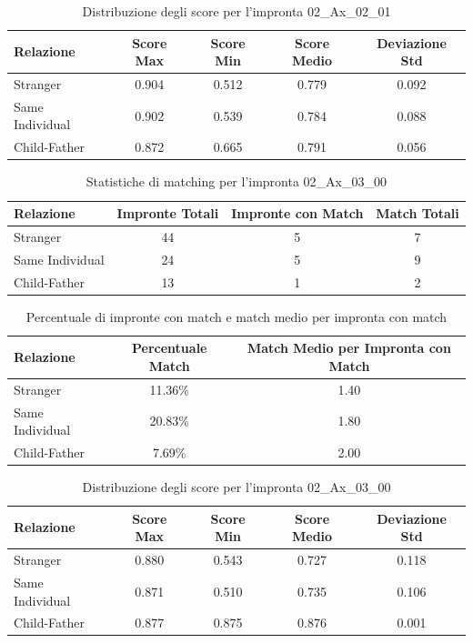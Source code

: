 \begin{table}[htbp]
\centering
\caption{Distribuzione degli score per l'impronta 02\_Ax\_02\_01}
\label{tab:scores_02_Ax_02_01}
\begin{tabular}{|l|c|c|c|c|}
\hline
\textbf{Relazione} & \textbf{Score Max} & \textbf{Score Min} & \textbf{Score Medio} & \textbf{Deviazione Std} \\
\hline
Stranger & 0.904 & 0.512 & 0.779 & 0.092 \\
\hline
Same Individual & 0.902 & 0.539 & 0.784 & 0.088 \\
\hline
Child-Father & 0.872 & 0.665 & 0.791 & 0.056 \\
\hline
\end{tabular}
\end{table}


\begin{table}[htbp]
\centering
\caption{Statistiche di matching per l'impronta 02\_Ax\_03\_00}
\label{tab:results_02_Ax_03_00}
\begin{tabular}{|l|c|c|c|}
\hline
\textbf{Relazione} & \textbf{Impronte Totali} & \textbf{Impronte con Match} & \textbf{Match Totali} \\
\hline
Stranger & 44 & 5 & 7 \\
\hline
Same Individual & 24 & 5 & 9 \\
\hline
Child-Father & 13 & 1 & 2 \\
\hline
\end{tabular}
\end{table}


\begin{table}[htbp]
\centering
\caption{Percentuale di impronte con match e match medio per impronta con match}
\label{tab:match_percentage_02_Ax_03_00}
\begin{tabular}{|l|c|c|}
\hline
\textbf{Relazione} & \textbf{Percentuale Match} & \textbf{Match Medio per Impronta con Match} \\
\hline
Stranger & 11.36\% & 1.40 \\
\hline
Same Individual & 20.83\% & 1.80 \\
\hline
Child-Father & 7.69\% & 2.00 \\
\hline
\end{tabular}
\end{table}


\begin{table}[htbp]
\centering
\caption{Distribuzione degli score per l'impronta 02\_Ax\_03\_00}
\label{tab:scores_02_Ax_03_00}
\begin{tabular}{|l|c|c|c|c|}
\hline
\textbf{Relazione} & \textbf{Score Max} & \textbf{Score Min} & \textbf{Score Medio} & \textbf{Deviazione Std} \\
\hline
Stranger & 0.880 & 0.543 & 0.727 & 0.118 \\
\hline
Same Individual & 0.871 & 0.510 & 0.735 & 0.106 \\
\hline
Child-Father & 0.877 & 0.875 & 0.876 & 0.001 \\
\hline
\end{tabular}
\end{table}


